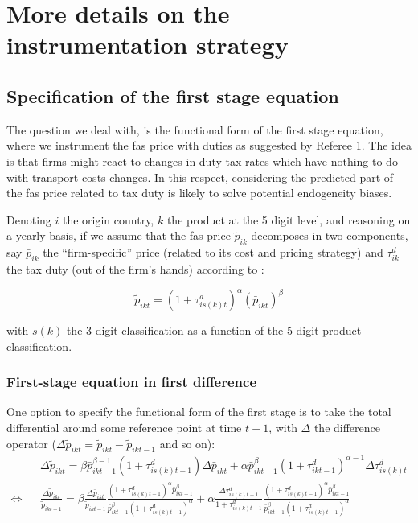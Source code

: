 \documentclass[a4paper,12pt]{article}
\begin{document}
\section{More details on the instrumentation strategy}

\subsection{Specification of the first stage equation}


The question we deal with, is the functional form of the first stage equation, where we instrument the fas price with duties as suggested by Referee 1. The idea is that firms might react to changes in duty tax rates which have nothing to do with transport costs changes. In this respect, considering the predicted part of the fas price related to tax duty is likely to solve potential endogeneity biases.

Denoting $i$ the origin country, $k$ the product at the 5 digit level, and reasoning on a yearly basis, if we assume that the fas price $\widetilde{p}_{ik}$ decomposes in two components, say $\bar{p}_{ik}$ the ``firm-specific'' price (related to its cost and pricing strategy) and $\tau^d_{ik}$ the tax duty (out of the firm's hands) according to :

\begin{equation}
\widetilde{p}_{ikt} = (1+\tau^d_{is(k)t})^\alpha \left(\bar{p}_{ikt}\right)^\beta \label{eq:link_fas_duty}
\end{equation}

\noindent with $s(k)$ the 3-digit classification as a function of the 5-digit product classification.

\subsubsection{First-stage equation in first difference \label{ssec:first_diff}}

One option to specify the functional form of the first stage is to take the total differential around some reference point at time $t-1$, with $\Delta $ the difference operator ($\Delta\widetilde{p}_{ikt} = \widetilde{p}_{ikt} - \widetilde{p}_{ikt-1}$ and so on):
\begin{eqnarray*}
&&\Delta \widetilde{p}_{ikt} = \beta \bar{p}_{ikt-1}^{\beta-1}(1+\tau^d_{is(k)t-1})\Delta \bar{p}_{ikt} + \alpha \bar{p}^\beta_{ikt-1} (1+\tau^d_{ikt-1})^{\alpha-1}\Delta \tau^d_{is(k)t}  \\
\Leftrightarrow &&\frac{\Delta \widetilde{p}_{ikt}}{\widetilde{p}_{ikt-1}} = \beta \frac{\Delta \bar{p}_{ikt}}{\widetilde{p}_{ikt-1}} \frac{(1+\tau^d_{is(k)t-1})^\alpha \bar{p}_{ikt-1}^\beta}{\bar{p}^\beta_{ikt-1}(1+\tau^d_{is(k)t-1})^\alpha} +\alpha \frac{\Delta \tau^d_{is(k)t-1}}{1+\tau_{is(k)t-1}^d}\frac{(1+\tau^d_{is(k)t-1})^\alpha \bar{p}_{ikt-1}^\beta}{\bar{p}^\beta_{ikt-1}(1+\tau^d_{is(k)t-1})^\alpha} \end{eqnarray*}
\end{document}
